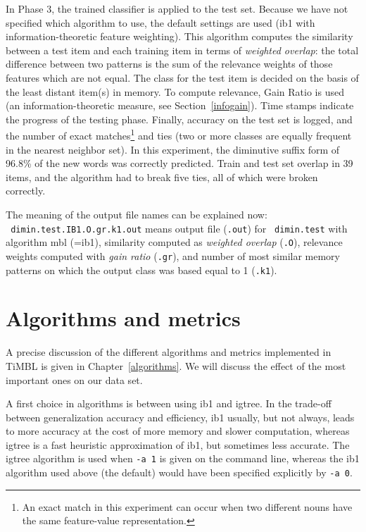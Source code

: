 \documentclass{report}
\begin{document}
In Phase 3, the trained classifier is applied to the test set. Because
we have not specified which algorithm to use, the default settings are
used ({\sc ib1} with information-theoretic feature weighting). This
algorithm computes the similarity between a test item and each
training item in terms of {\em weighted overlap}: the total difference
between two patterns is the sum of the relevance weights of those
features which are not equal. The class for the test item is decided
on the basis of the least distant item(s) in memory. To compute
relevance, Gain Ratio is used (an information-theoretic measure, see
Section~\ref{infogain}). Time stamps indicate the progress of the
testing phase. Finally, accuracy on the test set is logged, and the
number of exact matches\footnote{An exact match in this experiment can
  occur when two different nouns have the same feature-value
  representation.} and ties (two or more classes are equally frequent
in the nearest neighbor set). In this experiment, the diminutive
suffix form of 96.8\% of the new words was correctly predicted. Train
and test set overlap in 39 items, and the algorithm had to break five
ties, all of which were broken correctly.

The meaning of the output file names can be explained now:\\ {\tt
dimin.test.IB1.O.gr.k1.out} means output file ({\tt .out}) for {\tt
dimin.test} with algorithm {\sc mbl} (={\sc ib1}), similarity computed
as {\em weighted overlap} ({\tt .O}), relevance weights computed with
{\em gain ratio} ({\tt .gr}), and number of most similar memory
patterns on which the output class was based equal to 1 ({\tt .k1}).

\section{Algorithms and metrics}

A precise discussion of the different algorithms and metrics
implemented in TiMBL is given in Chapter~\ref{algorithms}. We will
discuss the effect of the most important ones on our data set.

A first choice in algorithms is between using {\sc ib1} and {\sc
igtree}. In the trade-off between generalization accuracy and
efficiency, {\sc ib1} usually, but not always, leads to more accuracy
at the cost of more memory and slower computation, whereas {\sc
igtree} is a fast heuristic approximation of {\sc ib1}, but sometimes
less accurate. The {\sc igtree} algorithm is used when {\tt -a 1} is
given on the command line, whereas the {\sc ib1} algorithm used above
(the default) would have been specified explicitly by {\tt -a 0}. 
\end{document}
